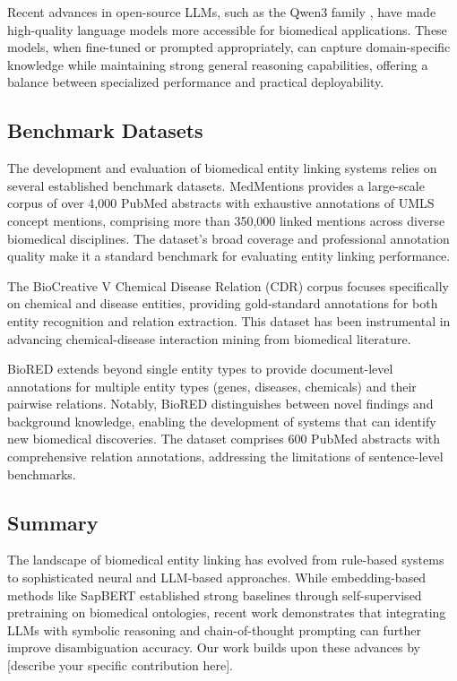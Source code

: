 Recent advances in open-source LLMs, such as the Qwen3 family \cite{qwen3}, have made high-quality language models more accessible for biomedical applications. These models, when fine-tuned or prompted appropriately, can capture domain-specific knowledge while maintaining strong general reasoning capabilities, offering a balance between specialized performance and practical deployability.

\subsection{Benchmark Datasets}

The development and evaluation of biomedical entity linking systems relies on several established benchmark datasets. MedMentions \cite{Med} provides a large-scale corpus of over 4,000 PubMed abstracts with exhaustive annotations of UMLS concept mentions, comprising more than 350,000 linked mentions across diverse biomedical disciplines. The dataset's broad coverage and professional annotation quality make it a standard benchmark for evaluating entity linking performance.

The BioCreative V Chemical Disease Relation (CDR) corpus \cite{li2016biocreative} focuses specifically on chemical and disease entities, providing gold-standard annotations for both entity recognition and relation extraction. This dataset has been instrumental in advancing chemical-disease interaction mining from biomedical literature.

BioRED \cite{biored2022} extends beyond single entity types to provide document-level annotations for multiple entity types (genes, diseases, chemicals) and their pairwise relations. Notably, BioRED distinguishes between novel findings and background knowledge, enabling the development of systems that can identify new biomedical discoveries. The dataset comprises 600 PubMed abstracts with comprehensive relation annotations, addressing the limitations of sentence-level benchmarks.

\subsection{Summary}

The landscape of biomedical entity linking has evolved from rule-based systems to sophisticated neural and LLM-based approaches. While embedding-based methods like SapBERT established strong baselines through self-supervised pretraining on biomedical ontologies, recent work demonstrates that integrating LLMs with symbolic reasoning and chain-of-thought prompting can further improve disambiguation accuracy. Our work builds upon these advances by [describe your specific contribution here].

